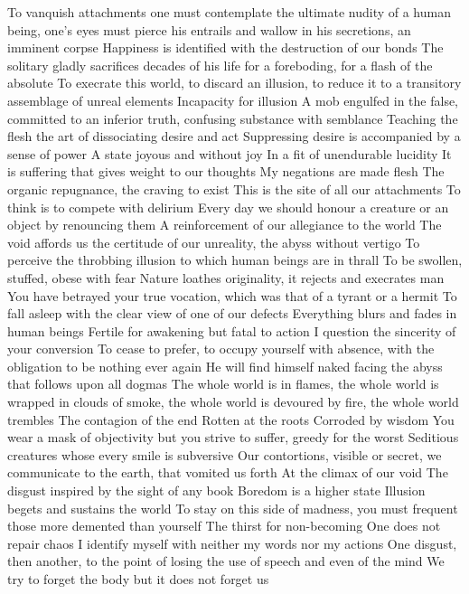 \documentclass{article}
\begin{document}
To vanquish attachments one must contemplate the ultimate nudity of a human being, one's eyes must pierce his entrails and wallow in his secretions, an imminent corpse
Happiness is identified with the destruction of our bonds
The solitary gladly sacrifices decades of his life for a foreboding, for a flash of the absolute
To execrate this world, to discard an illusion, to reduce it to a transitory assemblage of unreal elements
Incapacity for illusion
A mob engulfed in the false, committed to an inferior truth, confusing substance with semblance
Teaching the flesh the art of dissociating desire and act
Suppressing desire is accompanied by a sense of power
A state joyous and without joy
In a fit of unendurable lucidity
It is suffering that gives weight to our thoughts
My negations are made flesh
The organic repugnance, the craving to exist
This is the site of all our attachments
To think is to compete with delirium
Every day we should honour a creature or an object by renouncing them
A reinforcement of our allegiance to the world
The void affords us the certitude of our unreality, the abyss without vertigo
To perceive the throbbing illusion to which human beings are in thrall
To be swollen, stuffed, obese with fear
Nature loathes originality, it rejects and execrates man
You have betrayed your true vocation, which was that of a tyrant or a hermit
To fall asleep with the clear view of one of our defects
Everything blurs and fades in human beings
Fertile for awakening but fatal to action
I question the sincerity of your conversion
To cease to prefer, to occupy yourself with absence, with the obligation to be nothing ever again
He will find himself naked facing the abyss that follows upon all dogmas
The whole world is in flames, the whole world is wrapped in clouds of smoke, the whole world is devoured by fire, the whole world trembles
The contagion of the end
Rotten at the roots
Corroded by wisdom
You wear a mask of objectivity but you strive to suffer, greedy for the worst
Seditious creatures whose every smile is subversive
Our contortions, visible or secret, we communicate to the earth, that vomited us forth
At the climax of our void
The disgust inspired by the sight of any book
Boredom is a higher state
Illusion begets and sustains the world
To stay on this side of madness, you must frequent those more demented than yourself
The thirst for non-becoming
One does not repair chaos
I identify myself with neither my words nor my actions
One disgust, then another, to the point of losing the use of speech and even of the mind
We try to forget the body but it does not forget us
\end{document}
